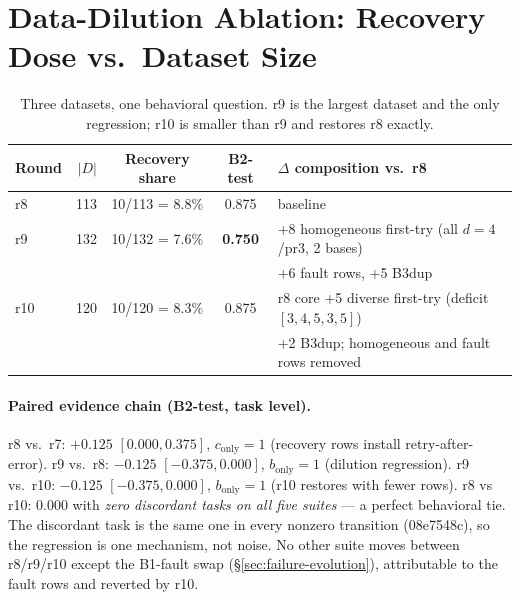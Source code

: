 \section{Data-Dilution Ablation: Recovery Dose vs.\ Dataset Size}
\label{sec:dilution}

\begin{table}[t]
\centering\small
\begin{tabular}{lrccl}
\toprule
Round & $|D|$ & Recovery share & B2-test & $\Delta$ composition vs.\ r8 \\
\midrule
r8  & 113 & 10/113 = 8.8\% & 0.875 & baseline \\
r9  & 132 & 10/132 = 7.6\% & \textbf{0.750} & +8 homogeneous first-try (all $d{=}4$/pr3, 2 bases) \\
    &     &                &        & \quad +6 fault rows, +5 B3dup \\
r10 & 120 & 10/120 = 8.3\% & 0.875 & r8 core +5 diverse first-try (deficit $[3,4,5,3,5]$) \\
    &     &                &        & \quad +2 B3dup; homogeneous and fault rows removed \\
\bottomrule
\end{tabular}
\caption{Three datasets, one behavioral question. r9 is the largest dataset and
the only regression; r10 is smaller than r9 and restores r8 exactly.}
\label{tab:dilution-setup}
\end{table}

\paragraph{Paired evidence chain (B2-test, task level).}
r8 vs.\ r7: $+0.125$ $[0.000, 0.375]$, $c_{\text{only}}{=}1$ (recovery rows
install retry-after-error). r9 vs.\ r8: $-0.125$ $[-0.375, 0.000]$,
$b_{\text{only}}{=}1$ (dilution regression). r9 vs.\ r10: $-0.125$
$[-0.375, 0.000]$, $b_{\text{only}}{=}1$ (r10 restores with fewer rows). r8 vs
r10: $0.000$ with \emph{zero discordant tasks on all five suites} --- a perfect
behavioral tie. The discordant task is the same one in every nonzero transition
(08e7548c), so the regression is one mechanism, not noise. No other suite moves
between r8/r9/r10 except the B1-fault swap (\S\ref{sec:failure-evolution}),
attributable to the fault rows and reverted by r10.

